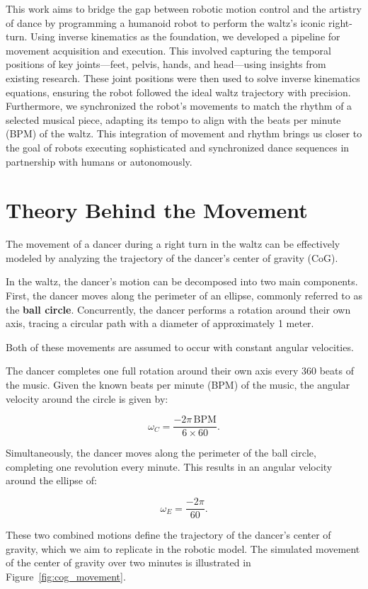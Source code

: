 \documentclass{amsart}
\theoremstyle{definition}
\theoremstyle{plain}
\begin{document}
This work aims to bridge the gap between robotic motion control and the artistry of dance by programming a humanoid robot to perform the waltz's iconic right-turn. Using inverse kinematics as the foundation, we developed a pipeline for movement acquisition and execution. This involved capturing the temporal positions of key joints—feet, pelvis, hands, and head—using insights from existing research. These joint positions were then used to solve inverse kinematics equations, ensuring the robot followed the ideal waltz trajectory with precision. Furthermore, we synchronized the robot's movements to match the rhythm of a selected musical piece, adapting its tempo to align with the beats per minute (BPM) of the waltz. This integration of movement and rhythm brings us closer to the goal of robots executing sophisticated and synchronized dance sequences in partnership with humans or autonomously.




\section{Theory Behind the Movement}

The movement of a dancer during a right turn in the waltz can be effectively modeled by analyzing the trajectory of the dancer’s center of gravity (CoG). 

In the waltz, the dancer’s motion can be decomposed into two main components. First, the dancer moves along the perimeter of an ellipse, commonly referred to as the \textbf{ball circle}. Concurrently, the dancer performs a rotation around their own axis, tracing a circular path with a diameter of approximately 1 meter. 

Both of these movements are assumed to occur with constant angular velocities.

The dancer completes one full rotation around their own axis every 360 beats of the music. Given the known beats per minute (BPM) of the music, the angular velocity around the circle is given by:

$$\omega_C = \frac{-2\pi \, \text{BPM}}{6 \times 60}.$$

Simultaneously, the dancer moves along the perimeter of the ball circle, completing one revolution every minute. This results in an angular velocity around the ellipse of:

$$\omega_E = \frac{-2\pi}{60}.$$

These two combined motions define the trajectory of the dancer's center of gravity, which we aim to replicate in the robotic model. The simulated movement of the center of gravity over two minutes is illustrated in Figure~\ref{fig:cog_movement}.
\end{document}
